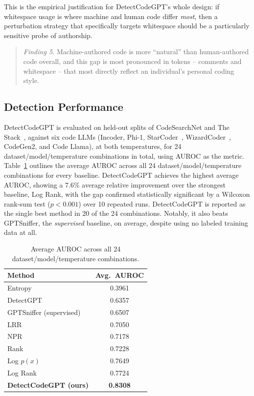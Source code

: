 \documentclass[manuscript,review]{acmart}
\begin{document}
This is the empirical justification for DetectCodeGPT's whole design: if whitespace usage is where machine and human code differ \emph{most}, then a perturbation strategy that specifically targets whitespace should be a particularly sensitive probe of authorship.

\begin{quote}
\textit{Finding 5.} Machine-authored code is more ``natural'' than human-authored code overall, and this gap is most pronounced in tokens -- comments and whitespace -- that most directly reflect an individual's personal coding style.
\end{quote}

\subsection{Detection Performance}
\label{sec:detection-perf}
DetectCodeGPT is evaluated on held-out splits of CodeSearchNet and The Stack~\cite{kocetkov2022stack}, against six code LLMs (Incoder, Phi-1, StarCoder~\cite{li2023starcoder}, WizardCoder~\cite{luo2023wizardcoder}, CodeGen2, and Code Llama), at both temperatures, for 24 dataset/model/temperature combinations in total, using AUROC as the metric. Table~\ref{tab:avgauroc} outlines the average AUROC across all 24 dataset/model/temperature combinations for every baseline. DetectCodeGPT achieves the highest average AUROC, showing a $7.6\%$ average relative improvement over the strongest baseline, Log Rank, with the gap confirmed statistically significant by a Wilcoxon rank-sum test ($p<0.001$) over 10 repeated runs. DetectCodeGPT is reported as the single best method in 20 of the 24 combinations. Notably, it also beats GPTSniffer, the \emph{supervised} baseline, on average, despite using no labeled training data at all.

\begin{table}[t]
\caption{Average AUROC across all 24 dataset/model/temperature combinations.}
\label{tab:avgauroc}
\begin{tabular}{@{}lc@{}}
\toprule
\textbf{Method} & \textbf{Avg.\ AUROC} \\
\midrule
Entropy                        & 0.3961 \\
DetectGPT                      & 0.6357 \\
GPTSniffer (supervised)        & 0.6507 \\
LRR                             & 0.7050 \\
NPR                              & 0.7178 \\
Rank                            & 0.7228 \\
Log $p(x)$                      & 0.7649 \\
Log Rank                        & 0.7724 \\
\textbf{DetectCodeGPT (ours)}   & \textbf{0.8308} \\
\bottomrule
\end{tabular}
\end{table}
\end{document}
